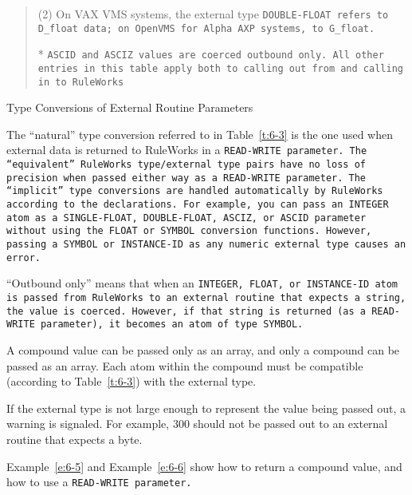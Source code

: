 \begin{table}[h]
\begin{quote}
    (2) On VAX VMS systems, the external type \tt{DOUBLE-FLOAT} refers
    to \verb|D_float data|; on OpenVMS for Alpha AXP systems, to
    \verb|G_float|.

    * \tt{ASCID} and \tt{ASCIZ} values are coerced outbound only. All
    other entries in this table apply both to calling out from and
    calling in to RuleWorks
  \end{quote}
  \caption{Type Conversions of External Routine Parameters}
  \label{t:6-3}
\end{table}

The ``natural'' type conversion referred to in Table~\ref{t:6-3} is
the one used when external data is returned to RuleWorks in a
\tt{READ-WRITE} parameter. The ``equivalent'' RuleWorks type/external
type pairs have no loss of precision when passed either way as a
\tt{READ-WRITE} parameter. The ``implicit'' type conversions are
handled automatically by RuleWorks according to the declarations. For
example, you can pass an \tt{INTEGER} atom as a \tt{SINGLE-FLOAT},
\tt{DOUBLE-FLOAT}, \tt{ASCIZ}, or \tt{ASCID} parameter without using
the \tt{FLOAT} or \tt{SYMBOL} conversion functions. However, passing a
\tt{SYMBOL} or \tt{INSTANCE-ID} as any numeric external type causes an
error.

``Outbound only'' means that when an \tt{INTEGER}, \tt{FLOAT}, or
\tt{INSTANCE-ID} atom is passed from RuleWorks to an external routine
that expects a string, the value is coerced.  However, if that string
is returned (as a \tt{READ-WRITE} parameter), it becomes an atom of type
\tt{SYMBOL}.

A compound value can be passed only as an array, and only a compound
can be passed as an array. Each atom within the compound must be
compatible (according to Table~\ref{t:6-3}) with the external type.

If the external type is not large enough to represent the value being
passed out, a warning is signaled. For example, 300 should not be
passed out to an external routine that expects a byte.

Example~\ref{e:6-5} and Example~\ref{e:6-6} show how to return a
compound value, and how to use a \tt{READ-WRITE} parameter.


